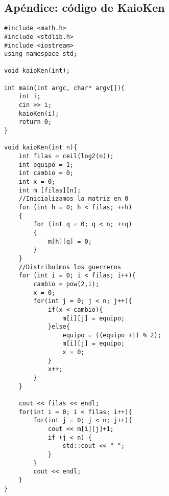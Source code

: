 \documentclass[10pt,a4paper]{article}
\begin{document}





\newpage

\subsection{Apéndice: código de KaioKen}
\begin{lstlisting}
#include <math.h>
#include <stdlib.h>
#include <iostream>
using namespace std;

void kaioKen(int);

int main(int argc, char* argv[]){
	int i;
	cin >> i;
	kaioKen(i);
	return 0;
}

void kaioKen(int n){
	int filas = ceil(log2(n));
	int equipo = 1;
	int cambio = 0;
	int x = 0;
	int m [filas][n];
	//Inicializamos la matriz en 0
	for (int h = 0; h < filas; ++h)
	{
		for (int q = 0; q < n; ++q)
		{
			m[h][q] = 0;
		}
	}
	//Distribuimos los guerreros
	for (int i = 0; i < filas; i++){
		cambio = pow(2,i);
		x = 0;
		for(int j = 0; j < n; j++){
			if(x < cambio){
				m[i][j] = equipo;
			}else{
				equipo = ((equipo +1) % 2);
				m[i][j] = equipo;
				x = 0;
			}
			x++;
		}
	}

	cout << filas << endl;
	for(int i = 0; i < filas; i++){
		for(int j = 0; j < n; j++){
			cout << m[i][j]+1;
			if (j < n) {
				std::cout << " ";
			}
		}
		cout << endl;
	}
}
\end{lstlisting}
\end{document}
